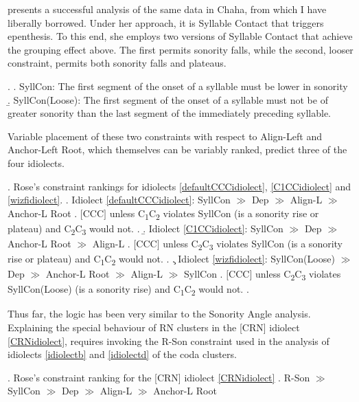 \documentclass[12pt]{article}
\begin{document}
\citet{rose.2000} presents a successful analysis of the same data in Chaha, from which I have liberally borrowed. Under her approach, it is Syllable Contact that triggers epenthesis. To this end, she employs two versions of Syllable Contact that achieve the grouping effect above. The first permits sonority falls, while the second, looser constraint, permits both sonority falls and plateaus.

\ex. \a. {\sc SyllCon}: The first segment of the onset of a syllable must be lower in sonority  \citep[(5)]{rose.2000}
     \b. {\sc SyllCon(Loose}): The first segment of the onset of a syllable must not be of greater sonority than the last segment of the immediately preceding syllable. \citep[(49)]{rose.2000}

Variable placement of these two constraints with respect to {\sc Align-Left} and {\sc Anchor-Left Root}, which themselves can be variably ranked, predict three of the four idiolects.

\ex. Rose's constraint rankings for idiolects \ref{defaultCCCidiolect}, \ref{C1CCidiolect} and \ref{wizfidiolect}.
    \a. Idiolect \ref{defaultCCCidiolect}: {\sc SyllCon} $\gg$ {\sc Dep} $\gg$ {\sc Align-L} $\gg$ {\sc Anchor-L Root}
          \a. $[$CCC$]$ unless C\textsubscript{1}C\textsubscript{2} violates {\sc SyllCon}
               (is a sonority rise or plateau) and C\textsubscript{2}C\textsubscript{3} would not.
          \z.
     \b. Idiolect \ref{C1CCidiolect}: {\sc SyllCon} $\gg$ {\sc Dep} $\gg$ {\sc Anchor-L Root} $\gg$ {\sc Align-L} 
          \a.  $[$CCC$]$ unless C\textsubscript{2}C\textsubscript{3} violates {\sc SyllCon}
                (is a sonority rise or plateau) and C\textsubscript{1}C\textsubscript{2} would not.
          \z.
     \c. Idiolect \ref{wizfidiolect}: {\sc SyllCon(Loose)} $\gg$ {\sc Dep} $\gg$ {\sc Anchor-L Root} $\gg$ {\sc Align-L} $\gg$ {\sc SyllCon}
          \a. $[$CCC$]$ unless C\textsubscript{2}C\textsubscript{3} violates {\sc SyllCon(Loose)} 
                (is a sonority rise) and C\textsubscript{1}C\textsubscript{2} would not.
          \z.

Thus far, the logic has been very similar to the {\sc Sonority Angle} analysis. Explaining the special behaviour of RN clusters in the [CRN] idiolect \ref{CRNidiolect}, requires invoking the {\sc *R-Son} constraint used in the analysis of idiolects \ref{idiolectb} and \ref{idiolectd} of the coda clusters.

\ex. Rose's constraint ranking for the [CRN] idiolect \ref{CRNidiolect}
     \a. {\sc *R-Son} $\gg$ {\sc SyllCon} $\gg$ {\sc Dep} $\gg$ {\sc Align-L} $\gg$ {\sc Anchor-L Root}
\end{document}
